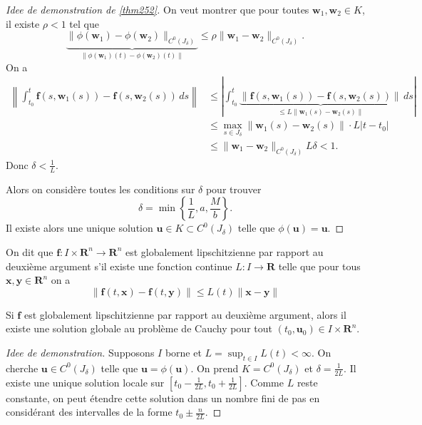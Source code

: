 \begin{proof}[Idee de demonstration de \ref{thm252}]
On veut montrer que pour toutes $\boldsymbol{w}_{1},\boldsymbol{w}_{2}\in K$, il existe $\rho<1$ tel que
$$
\underbrace{ \lVert \phi(\boldsymbol{w}_{1})-\phi(\boldsymbol{w}_{2}) \rVert _{C^{0}(J_{\delta})} }_{ \lVert \phi(\boldsymbol{w}_{1})(t)-\phi(\boldsymbol{w}_{2})(t) \rVert  }\le \rho \lVert \boldsymbol{w}_{1}-\boldsymbol{w}_{2} \rVert _{C^{0}(J_{\delta})}.
$$
On a
\begin{align*}
\left\lVert  \int_{t_{0}}^{t} \boldsymbol{f}(s,\boldsymbol{w}_{1}(s))-\boldsymbol{f}(s,\boldsymbol{w}_{2}(s)) \, ds   \right\rVert  & \le \left\lvert  \int_{t_{0}}^{t}\underbrace{  \lVert \boldsymbol{f}(s,\boldsymbol{w}_{1}(s))-\boldsymbol{f}(s,\boldsymbol{w}_{2}(s)) \rVert }_{ \le L\lVert \boldsymbol{w}_{1}(s)-\boldsymbol{w}_{2}(s) \rVert  }  \, ds   \right\rvert  \\
 & \le \max_{s \in J_{\delta}}\lVert \boldsymbol{w}_{1}(s)-\boldsymbol{w}_{2}(s) \rVert \cdot L|t-t_{0}| \\
 &  \le \lVert \boldsymbol{w}_{1}-\boldsymbol{w}_{2} \rVert _{C^{0}(J_{\delta})}L\delta<1.
\end{align*}
Donc $\delta< \frac{1}{L}$. 

Alors on considère toutes les conditions sur $\delta$ pour trouver
$$
\delta =\min \left\{  \frac{1}{L},a, \frac{M}{b}  \right\}.
$$
Il existe alors une unique solution $\boldsymbol{u}\in K\subset C^{0}(J_{\delta})$ telle que $\phi(\boldsymbol{u})=\boldsymbol{u}$.
\end{proof}

\begin{definition}
On dit que $\boldsymbol{f}:I\times \mathbf{R}^{n}\to \mathbf{R}^{n}$ est globalement lipschitzienne par rapport au deuxième argument s'il existe une fonction continue $L:I\to \mathbf{R}$ telle que pour tous $\boldsymbol{x},\boldsymbol{y}\in \mathbf{R}^{n}$ on a
$$
\lVert \boldsymbol{f}(t,\boldsymbol{x})-\boldsymbol{f}(t,\boldsymbol{y}) \rVert \le L(t) \lVert \boldsymbol{x}-\boldsymbol{y} \rVert 
$$
\end{definition}
\begin{theorem}
Si $\boldsymbol{f}$ est globalement lipschitzienne par rapport au deuxième argument, alors il existe une solution globale au problème de Cauchy pour tout $(t_{0},\boldsymbol{u}_{0})\in I\times \mathbf{R}^{n}$.
\end{theorem}
\begin{proof}[Idee de demonstration]
Supposons $I$ borne et $L=\sup_{t\in I}L(t)<\infty$. On cherche $\boldsymbol{u}\in C^{0}(J_{\delta})$ telle que $\boldsymbol{u}=\phi(\boldsymbol{u})$. On prend $K=C^{0}(J_{\delta})$ et $\delta=\frac{1}{2L}$. Il existe une unique solution locale sur $\left[ t_{0}-\frac{1}{2L},t_{0}+\frac{1}{2L} \right]$. Comme $L$ reste constante, on peut étendre cette solution dans un nombre fini de pas en considérant des intervalles de la forme $t_{0}\pm \frac{n}{2L}$.
\end{proof}
